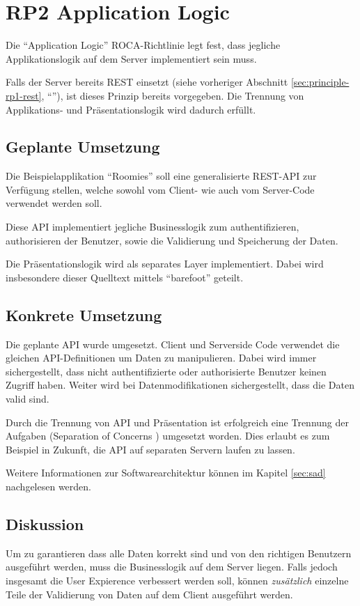 \section{RP2 Application Logic}
\label{sec:principle-rp2-application-logic}

Die ``Application Logic'' ROCA-Richtlinie legt fest, dass jegliche Applikationslogik auf dem Server implementiert sein muss.

Falls der Server bereits \gls{REST} einsetzt (siehe vorheriger Abschnitt \ref{sec:principle-rp1-rest}, ``''), ist dieses Prinzip bereits vorgegeben. Die Trennung von Applikations- und Präsentationslogik wird dadurch erfüllt.

\subsection*{Geplante Umsetzung}

Die Beispielapplikation ``Roomies'' soll eine generalisierte REST-API zur Verfügung stellen, welche sowohl vom Client- wie auch vom Server-Code verwendet werden soll.

Diese API implementiert jegliche Businesslogik zum authentifizieren, authorisieren der Benutzer, sowie die Validierung und Speicherung der Daten.

Die Präsentationslogik wird als separates Layer implementiert. Dabei wird insbesondere dieser Quelltext mittels ``barefoot'' geteilt.

\subsection*{Konkrete Umsetzung}
Die geplante API wurde umgesetzt. Client und Serverside Code verwendet die gleichen API-Definitionen um Daten zu manipulieren. Dabei wird immer sichergestellt, dass nicht authentifizierte oder authorisierte Benutzer keinen Zugriff haben.
Weiter wird bei Datenmodifikationen sichergestellt, dass die Daten valid sind.

Durch die Trennung von API und Präsentation ist erfolgreich eine Trennung der Aufgaben (Separation of Concerns \cite{SeparationOfConcerns}) umgesetzt worden. Dies erlaubt es zum Beispiel in Zukunft, die API auf separaten Servern laufen zu lassen.

Weitere Informationen zur Softwarearchitektur können im Kapitel \ref{sec:sad}  nachgelesen werden.

\subsection*{Diskussion}
Um zu garantieren dass alle Daten korrekt sind und von den richtigen Benutzern ausgeführt werden, muss die Businesslogik auf dem Server liegen.
Falls jedoch insgesamt die User Expierence verbessert werden soll, können \emph{zusätzlich} einzelne Teile der Validierung von Daten auf dem Client ausgeführt werden.

